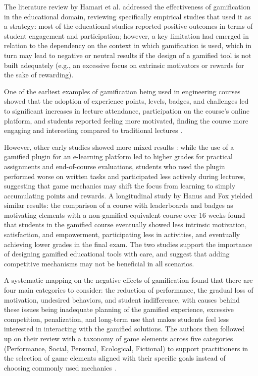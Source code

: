 The literature review by Hamari et al. \cite{hamari2014does} addressed the effectiveness of gamification in the educational domain, reviewing specifically empirical studies that used it as a strategy: most of the educational studies reported positive outcomes in terms of student engagement and participation; however, a key limitation had emerged in relation to the dependency on the context in which gamification is used, which in turn may lead to negative or neutral results if the design of a gamified tool is not built adequately (e.g., an excessive focus on extrinsic motivators or rewards for the sake of rewarding). 

One of the earliest examples of gamification being used in engineering courses showed that the adoption of experience points, levels, badges, and challenges led to significant increases in lecture attendance, participation on the course's online platform, and students reported feeling more motivated, finding the course more engaging and interesting compared to traditional lectures \cite{barata2013engaging}. 

However, other early studies showed more mixed results \cite{dominguez2013gamifying}: while the use of a gamified plugin for an e-learning platform led to higher grades for practical assignments and end-of-course evaluations, students who used the plugin performed worse on written tasks and participated less actively during lectures, suggesting that game mechanics may shift the focus from learning to simply accumulating points and rewards. A longitudinal study by Hanus and Fox \cite{hanus2015assessing} yielded similar results: the comparison of a course with leaderboards and badges as motivating elements with a non-gamified equivalent course over 16 weeks found that students in the gamified course eventually showed less intrinsic motivation, satisfaction, and empowerment, participating less in activities, and eventually achieving lower grades in the final exam. The two studies support the importance of designing gamified educational tools with care, and suggest that adding competitive mechanisms may not be beneficial in all scenarios.

A systematic mapping on the negative effects of gamification \cite{toda2017dark} found that there are four main categories to consider: the reduction of performance, the gradual loss of motivation, undesired behaviors, and student indifference, with causes behind these issues being inadequate planning of the gamified experience, excessive competition, penalization, and long-term use that makes students feel less interested in interacting with the gamified solutions. The authors then followed up on their review with a taxonomy of game elements across five categories (Performance, Social, Personal, Ecological, Fictional) to support practitioners in the selection of game elements aligned with their specific goals instead of choosing commonly used mechanics \cite{toda2019taxonomy}.

